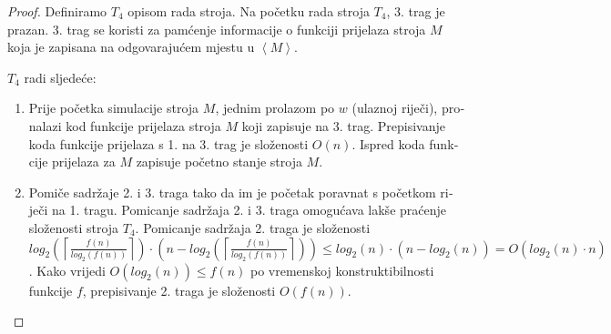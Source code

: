 \documentclass[12pt]{rectors}
\begin{document}
\begin{otherlanguage}{croatian}
\begin{proof}
Definiramo $T_4$ opisom rada stroja.
Na početku rada stroja $T_4$, 3. trag je prazan.
3. trag se koristi za pamćenje informacije o funkciji prijelaza stroja $M$ koja je zapisana na odgovarajućem mjestu u $\left < M \right >$.

$T_4$ radi sljedeće:
\begin{enumerate}
    \item Prije početka simulacije stroja $M$, jednim prolazom po $w$ (ulaznoj riječi), pronalazi kod funkcije prijelaza stroja $M$ koji zapisuje na 3. trag.
    Prepisivanje koda funkcije prijelaza s 1. na 3. trag je složenosti $O(n)$. Ispred koda funkcije prijelaza za $M$ zapisuje početno stanje stroja $M$.
    
    \item Pomiče sadržaje 2. i 3. traga tako da im je početak poravnat s početkom riječi na 1. tragu. Pomicanje sadržaja 2. i 3. traga omogućava lakše praćenje složenosti stroja $T_4$.
    Pomicanje sadržaja 2. traga je složenosti \newline $ log_2\left (\left \lceil{ \frac{f(n)}{log_2(f(n))} }\right \rceil \right ) \cdot  \left (n-log_2 \left (\left \lceil{ \frac{f(n)}{log_2(f(n))} }\right \rceil \right ) \right ) \leq log_2(n) \cdot (n-log_2(n)) = O(log_2(n) \cdot n) $. Kako vrijedi $O(log_2(n)) \leq f(n) $ po vremenskoj konstruktibilnosti funkcije $f$, prepisivanje 2. traga je složenosti 
    $O(f(n))$.
    

\end{enumerate}
\end{proof}
\end{otherlanguage}
\end{document}

